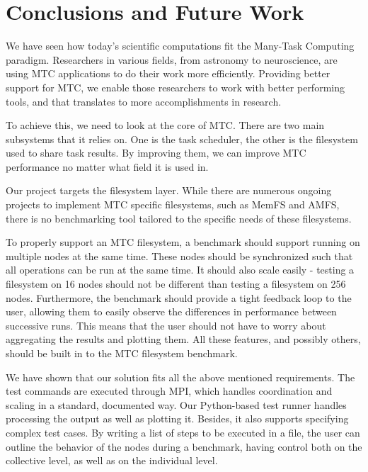
\chapter{Conclusions and Future Work} %

\label{Chapter5} %


We have seen how today's scientific computations fit the Many-Task Computing paradigm. Researchers in various fields, from astronomy to neuroscience, are using MTC applications to do their work more efficiently. Providing better support for MTC, we enable those researchers to work with better performing tools, and that translates to more accomplishments in research.

To achieve this, we need to look at the core of MTC. There are two main subsystems that it relies on. One is the task scheduler, the other is the filesystem used to share task results. By improving them, we can improve MTC performance no matter what field it is used in.

Our project targets the filesystem layer. While there are numerous ongoing projects to implement MTC specific filesystems, such as MemFS\cite{memfs} and AMFS\cite{amfs}, there is no benchmarking tool tailored to the specific needs of these filesystems.

To properly support an MTC filesystem, a benchmark should support running on multiple nodes at the same time. These nodes should be synchronized such that all operations can be run at the same time. It should also scale easily - testing a filesystem on 16 nodes should not be different than testing a filesystem on 256 nodes. Furthermore, the benchmark should provide a tight feedback loop to the user, allowing them to easily observe the differences in performance between successive runs. This means that the user should not have to worry about aggregating the results and plotting them. All these features, and possibly others, should be built in to the MTC filesystem benchmark.

We have shown that our solution fits all the above mentioned requirements. The test commands are executed through MPI, which handles coordination and scaling in a standard, documented way. Our Python-based test runner handles processing the output as well as plotting it. Besides, it also supports specifying complex test cases. By writing a list of steps to be executed in a file, the user can outline the behavior of the nodes during a benchmark, having control both on the collective level, as well as on the individual level.

